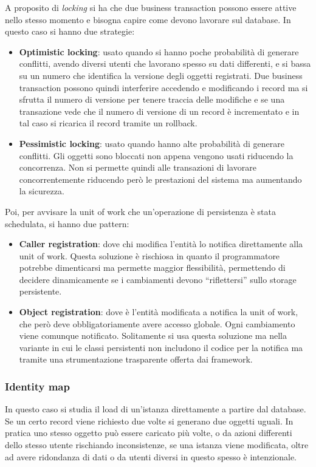 A proposito di \textit{locking} si ha che due business transaction possono essere
attive nello stesso momento e bisogna capire come devono lavorare sul database.
In questo caso si hanno due strategie:
\begin{itemize}
      \item \textbf{Optimistic locking}: usato quando si hanno poche probabilità
            di generare conflitti, avendo diversi utenti che lavorano spesso su
            dati differenti, e si bassa su un numero che identifica la versione
            degli oggetti registrati. Due business transaction possono quindi
            interferire accedendo e modificando i record ma si sfrutta il numero
            di versione per tenere traccia delle modifiche e se una transazione
            vede che il numero di versione di un record è incrementato e in tal
            caso si ricarica il record tramite un rollback.
      \item \textbf{Pessimistic locking}: usato quando hanno alte probabilità di
            generare conflitti. Gli oggetti sono bloccati non appena vengono
            usati riducendo la concorrenza. Non si permette quindi alle transazioni
            di lavorare concorrentemente riducendo però le prestazioni del sistema
            ma aumentando la sicurezza.
\end{itemize}
Poi, per avvisare la unit of work che un'operazione di persistenza è stata
schedulata, si hanno due pattern:
\begin{itemize}
      \item \textbf{Caller registration}: dove chi modifica l'entità lo notifica
            direttamente alla unit of work. Questa soluzione è rischiosa in quanto
            il programmatore potrebbe dimenticarsi ma permette maggior flessibilità,
            permettendo di decidere dinamicamente se i cambiamenti devono
            “riflettersi” sullo storage persistente.
      \item \textbf{Object registration}: dove è l'entità modificata a notifica la
            unit of work, che però deve obbligatoriamente avere accesso globale.
            Ogni cambiamento viene comunque notificato. Solitamente si usa questa
            soluzione ma nella variante in cui le classi persistenti non includono
            il codice per la notifica ma tramite una strumentazione trasparente
            offerta dai framework.
\end{itemize}
\subsubsection{Identity map}
In questo caso si studia il load di un'istanza direttamente a partire dal database.
Se un certo record viene richiesto due volte si generano due oggetti uguali.
In pratica uno stesso oggetto può essere caricato più volte, o da azioni differenti
dello stesso utente rischiando inconsistenze, se una istanza viene modificata,
oltre ad avere ridondanza di dati o da utenti diversi in questo spesso è intenzionale.

